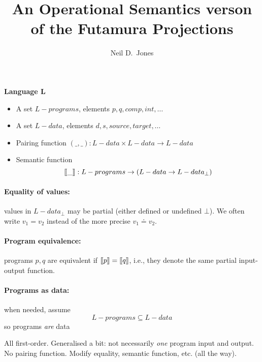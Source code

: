 \documentclass[11pt,fleqn]{article}
\title{An Operational Semantics verson of the Futamura Projections}
\author{Neil D.\ Jones}
\newcommand{\lsem}{\mbox{$\lbrack\hspace{-0.3ex}\lbrack$}}
\newcommand{\rsem}{\mbox{$\rbrack\hspace{-0.3ex}\rbrack$}}
\newcommand{\bc}{\begin{center}}
\newcommand{\ec}{\end{center}}
\newcommand{\bi}{\begin{itemize}}
\newcommand{\ei}{\end{itemize}}
\newcommand{\pg}[1]{\paragraph{#1}}
\begin{document}
\maketitle




\bc{}
\ec


\vspace{25mm}

{\bf Language L} 
\bi
\item A set $L-programs$, elements $p, q, comp, int,\ldots$
\item A set $L-data$, elements $d, s, source, target,\ldots$

\item Pairing function $(\_,\_) : L-data \times L-data \to L-data$
\item Semantic function
$$
\lsem\_\rsem : L-programs \to (L-data \to L-data_\bot)
$$
\ei



\vspace{3mm}

\pg{Equality of values:} values in $L-data_\bot$ may be partial (either defined or undefined $\bot$). We often write
$ v_1 = v_2$  instead of the more precise $ v_1 \doteq v_2$.


\pg{Program equivalence:} programs $p,q$ are equivalent if $\lsem p\rsem = \lsem q\rsem$, i.e., they denote the same partial input-output function. 


\vspace{18mm}

\pg{Programs as data:} when needed, assume $$L-programs \subseteq L-data$$
so programs {\em are} data

\newpage




\bc{}
\ec



All first-order. Generalised a bit: not necessarily {\em one} program input and output.
No pairing function. Modify equality, semantic function, etc. (all the way).


\vspace{5mm}
\end{document}
